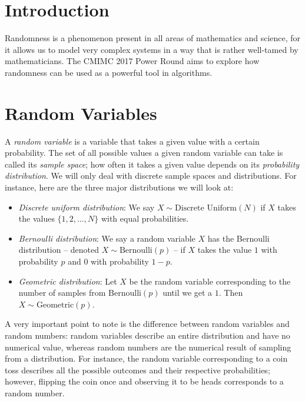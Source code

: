 \documentclass[12pt]{article}
\theoremstyle{plain}
\theoremstyle{definition}
\theoremstyle{remark}
\begin{document}
\newpage

\section{Introduction}

Randomness is a phenomenon present in all areas of mathematics and science, for it allows us to model very complex systems in a way that is rather well-tamed by mathematicians. The CMIMC 2017 Power Round aims to explore how randomness can be used as a powerful tool in algorithms.

\section{Random Variables}

A \emph{random variable} is a variable that takes a given value with a certain probability. The set of all possible values a given random variable can take is called its \emph{sample space}; how often it takes a given value depends on its \emph{probability distribution}. We will only deal with discrete sample spaces and distributions. For instance, here are the three major distributions we will look at:

\begin{itemize}
\item \emph{Discrete uniform distribution}: We say $X\sim\text{Discrete Uniform}(N)$ if $X$ takes the values $\{1,2,\dots,N\}$ with equal probabilities.

\item \emph{Bernoulli distribution}: We say a random variable $X$ has the Bernoulli distribution -- denoted $X\sim\text{Bernoulli}(p)$ -- if $X$ takes the value $1$ with probability $p$ and $0$ with probability $1-p$.

\item \emph{Geometric distribution}: Let $X$ be the random variable corresponding to the number of samples from $\text{Bernoulli}(p)$ until we get a $1$. Then $X\sim\text{Geometric}(p)$.
\end{itemize}

A very important point to note is the difference between random variables and random numbers: random variables describe an entire distribution and have no numerical value, whereas random numbers are the numerical result of sampling from a distribution. For instance, the random variable corresponding to a coin toss describes all the possible outcomes and their respective probabilities; however, flipping the coin once and observing it to be heads corresponds to a random number.
\end{document}
